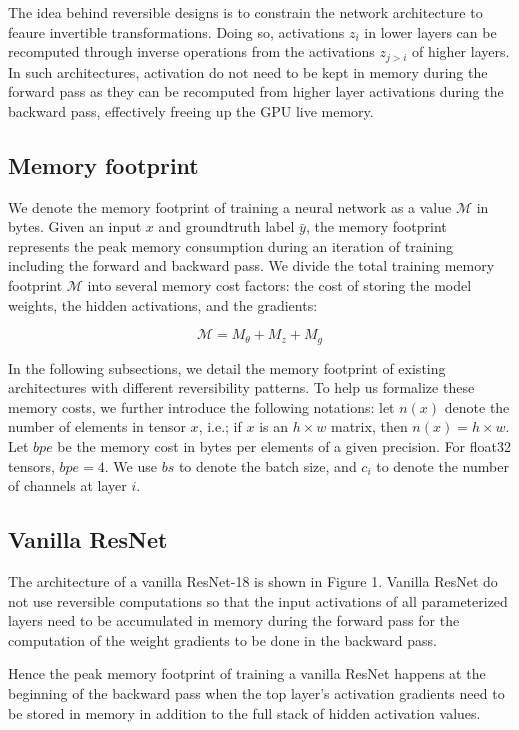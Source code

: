 \documentclass[twocolumn]{bmcart}
\begin{document}
The idea behind reversible designs is to constrain the network architecture to feaure invertible transformations. 
Doing so, activations $z_i$ in lower layers can be recomputed through inverse operations from the activations $z_{j>i}$ of higher layers. 
In such architectures, activation do not need to be kept in memory during the forward pass as they can be recomputed from higher layer activations during the backward pass, effectively freeing up the GPU live memory.

\subsection{Memory footprint}

We denote the memory footprint of training a neural network as a value $\mathcal{M}$ in bytes. Given an input $x$ and groundtruth label $\bar{y}$, the memory footprint represents the peak memory consumption during an iteration of training including the forward and backward pass. 
We divide the total training memory footprint $\mathcal{M}$ into several memory cost factors: the cost of storing the model weights, the hidden activations, and the gradients:

\begin{equation}
\mathcal{M} = M_{\theta} + M_{z} + M_{g}
\end{equation}

In the following subsections, we detail the memory footprint of existing architectures with different reversibility patterns. 
To help us formalize these memory costs, we further introduce the following notations: let $n(x)$ denote the number of elements in tensor $x$, i.e.; if $x$ is an $h \times w$ matrix, then $n(x)=h \times w$. 
Let $bpe$ be the memory cost in bytes per elements of a given precision. 
For float32 tensors, $bpe=4$. We use $bs$ to denote the batch size, and $c_i$ to denote the number of channels at layer $i$.

\subsection{Vanilla ResNet}

The architecture of a vanilla ResNet-18 is shown in Figure 1.
Vanilla ResNet do not use reversible computations so that the input activations of all parameterized layers need to be accumulated in memory during the forward pass for the computation of the weight gradients to be done in the backward pass.

Hence the peak memory footprint of training a vanilla ResNet happens at the beginning of the backward pass when the top layer's activation gradients need to be stored in memory in addition to the full stack of hidden activation values.
\end{document}
